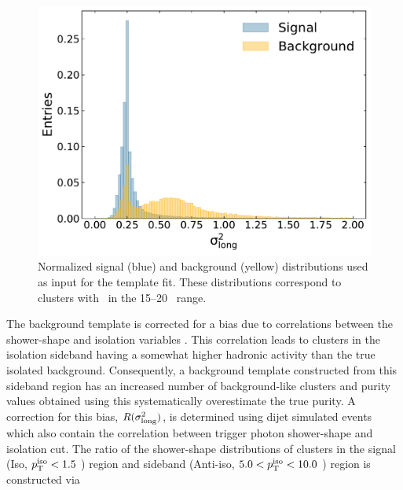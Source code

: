 \begin{figure}
\center
\includegraphics[width=0.5\textheight]{Data_Analysis/Purity/norm-templates-p-Pb-cluster_Lambda-15-20.pdf}
\caption{Normalized signal (blue) and background (yellow) distributions used as input for the template fit. These distributions correspond to clusters with \pt~in the 15--20 \GeVc~range.}
\label{TemplateShapes}
\end{figure}


The background template is corrected for a bias due to correlations between the shower-shape and isolation variables \cite{Khachatryan:2010fm}. 
This correlation leads to clusters in the isolation sideband having a somewhat higher hadronic activity than the true isolated background. Consequently, a background template constructed from this sideband region has an increased number of background-like clusters and
purity values obtained using this
 systematically overestimate the true purity.
A correction for this bias, $R(\sigma^{2}_{\mathrm{long}})$, is determined using dijet simulated events which also contain the correlation between trigger photon shower-shape and isolation cut.
The ratio of the shower-shape distributions of clusters in the signal (Iso, $p_{\mathrm{T}}^\mathrm{iso} < 1.5$ \GeVc) region and sideband (Anti-iso, $5.0 < p_{\mathrm{T}}^\mathrm{iso} < 10.0$ \GeVc) region is constructed via


